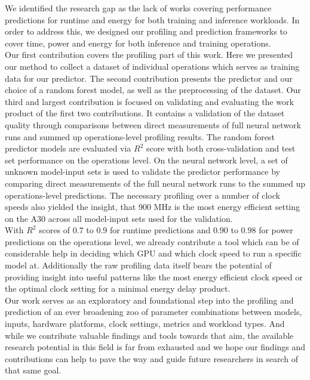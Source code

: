 We identified the research gap as the lack of works covering performance predictions for runtime and energy for both training and inference workloads. In order to address this, we designed our profiling and prediction frameworks to cover time, power and energy for both inference and training operations. \\
Our first contribution covers the profiling part of this work. Here we presented our method to collect a dataset of individual operations which serves as training data for our predictor. The second contribution presents the predictor and our choice of a random forest model, as well as the preprocessing of the dataset. Our third and largest contribution is focused on validating and evaluating the work product of the first two contributions. It contains a validation of the dataset quality through comparisons between direct measurements of full neural network runs and summed up operations-level profiling results. The random forest predictor models are evaluated via $R^2$ score with both cross-validation and test set performance on the operations level. On the neural network level, a set of unknown model-input sets is used to validate the predictor performance by comparing direct measurements of the full neural network runs to the summed up operations-level predictions. The necessary profiling over a number of clock speeds also yielded the insight, that 900 MHz is the most energy efficient setting on the A30 across all model-input sets used for the validation. \\
With $R^2$ scores of $0.7$ to $0.9$ for runtime predictions and $0.90$ to $0.98$ for power predictions on the operations level, we already contribute a tool which can be of considerable help in deciding which GPU and which clock speed to run a specific model at. Additionally the raw profiling data itself bears the potential of providing insight into useful patterns like the most energy efficient clock speed or the optimal clock setting for a minimal energy delay product. \\
Our work serves as an exploratory and foundational step into the profiling and prediction of an ever broadening zoo of parameter combinations between models, inputs, hardware platforms, clock settings, metrics and workload types. And while we contribute valuable findings and tools towards that aim, the available research potential in this field is far from exhausted and we hope our findings and contributions can help to pave the way and guide future researchers in search of that same goal.